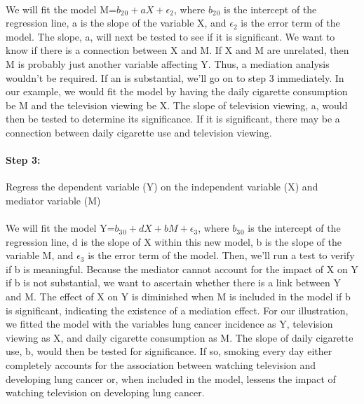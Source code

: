 \documentclass[12pt]{report}
\begin{document}
\paragraph{}
We will fit the model M=\begin{math}b_2{}_0+aX+\epsilon_2\end{math}, where \begin{math}b_2{}_0\end{math} is the intercept of the regression line, a is the slope of the variable X, and \begin{math}\epsilon_2\end{math} is the error term of the model. The slope, a, will next be tested to see if it is significant. We want to know if there is a connection between X and M. If X and M are unrelated, then M is probably just another variable affecting Y. Thus, a mediation analysis wouldn't be required. If an is substantial, we'll go on to step 3 immediately. In our example, we would fit the model by having the daily cigarette consumption be M and the television viewing be X. The slope of television viewing, a, would then be tested to determine its significance. If it is significant, there may be a connection between daily cigarette use and television viewing.

\paragraph{Step 3:}
Regress the dependent variable (Y) on the independent variable (X) and mediator variable (M)

\paragraph{}

We will fit the model Y=\begin{math}b_3{}_0+dX+bM+\epsilon_3\end{math}, where \begin{math}b_3{}_0\end{math} is the intercept of the regression line, d is the slope of X within this new model, b is the slope of the variable M, and \begin{math}\epsilon_3\end{math} is the error term of the model. Then, we'll run a test to verify if b is meaningful. Because the mediator cannot account for the impact of X on Y if b is not substantial, we want to ascertain whether there is a link between Y and M. The effect of X on Y is diminished when M is included in the model if b is significant, indicating the existence of a mediation effect. For our illustration, we fitted the model with the variables lung cancer incidence as Y, television viewing as X, and daily cigarette consumption as M. The slope of daily cigarette use, b, would then be tested for significance. If so, smoking every day either completely accounts for the association between watching television and developing lung cancer or, when included in the model, lessens the impact of watching television on developing lung cancer.
\end{document}

